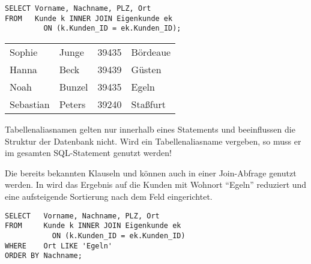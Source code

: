 \begin{lstlisting}[language=oracle_sql,caption={Die Benutzung von Tabellenaliasnamen},label=sql04_04]
SELECT Vorname, Nachname, PLZ, Ort
FROM   Kunde k INNER JOIN Eigenkunde ek
         ON (k.Kunden_ID = ek.Kunden_ID);
        \end{lstlisting}
\begin{center}
    \begin{small}
        \tablehead{}
        \begin{msoraclesql}
            \begin{supertabular}{llll}
                Sophie & Junge & 39435 & Bördeaue \\
                Hanna & Beck & 39439 & Güsten \\
                Noah & Bunzel & 39435 & Egeln \\
                Sebastian & Peters & 39240 & Staßfurt \\
            \end{supertabular}
        \end{msoraclesql}
    \end{small}
\end{center}
\begin{merke}
    Tabellenaliasnamen gelten nur innerhalb eines Statements und beeinflussen die Struktur der Datenbank nicht. Wird ein Tabellenaliasname vergeben, so muss er im gesamten SQL-Statement genutzt werden!
\end{merke}
Die bereits bekannten Klauseln  und  können auch in einer Join-Abfrage genutzt werden. In  wird das Ergebnis auf die Kunden mit Wohnort \enquote{Egeln} reduziert und eine aufsteigende Sortierung nach dem Feld  eingerichtet.
\begin{lstlisting}[language=oracle_sql,caption={Join mit einschränkender WHERE-Klausel und Sortierung},label=sql04_05]
SELECT   Vorname, Nachname, PLZ, Ort
FROM     Kunde k INNER JOIN Eigenkunde ek
           ON (k.Kunden_ID = ek.Kunden_ID)
WHERE    Ort LIKE 'Egeln'
ORDER BY Nachname;
        \end{lstlisting}
